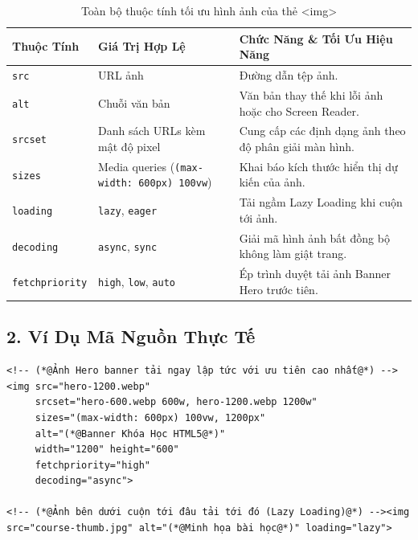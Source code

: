 \documentclass[11pt,oneside]{book}
\newcommand{\codeinline}[1]{\textcolor{accentOrange}{\texttt{#1}}}
\begin{document}
\begin{table}[H]
\centering
\begin{prettyTableBox}
\small
{}
\begin{tabularx}{\linewidth}{lp{3.5cm}X}
\rowcolor{primaryBlue}
\color{white}\textbf{Thuộc Tính} & \color{white}\textbf{Giá Trị Hợp Lệ} & \color{white}\textbf{Chức Năng \& Tối Ưu Hiệu Năng} \\
\hline
\codeinline{src} & URL ảnh & Đường dẫn tệp ảnh. \\
\codeinline{alt} & Chuỗi văn bản & Văn bản thay thế khi lỗi ảnh hoặc cho Screen Reader. \\
\codeinline{srcset} & Danh sách URLs kèm mật độ pixel & Cung cấp các định dạng ảnh theo độ phân giải màn hình. \\
\codeinline{sizes} & Media queries (\codeinline{(max-width: 600px) 100vw}) & Khai báo kích thước hiển thị dự kiến của ảnh. \\
\codeinline{loading} & \codeinline{lazy}, \codeinline{eager} & Tải ngầm Lazy Loading khi cuộn tới ảnh. \\
\codeinline{decoding} & \codeinline{async}, \codeinline{sync} & Giải mã hình ảnh bất đồng bộ không làm giật trang. \\
\codeinline{fetchpriority} & \codeinline{high}, \codeinline{low}, \codeinline{auto} & Ép trình duyệt tải ảnh Banner Hero trước tiên. \\
\end{tabularx}
\end{prettyTableBox}
\vspace{-2pt}
\caption{Toàn bộ thuộc tính tối ưu hình ảnh của thẻ <img>}
\end{table}

\subsection{2. Ví Dụ Mã Nguồn Thực Tế}
\begin{lstlisting}[language=HTML5, caption={Ví dụ ảnh chuẩn Responsive kèm Lazy Loading và Fetch Priority}]
<!-- (*@Ảnh Hero banner tải ngay lập tức với ưu tiên cao nhất@*) --><img src="hero-1200.webp"
     srcset="hero-600.webp 600w, hero-1200.webp 1200w"
     sizes="(max-width: 600px) 100vw, 1200px"
     alt="(*@Banner Khóa Học HTML5@*)"
     width="1200" height="600"
     fetchpriority="high"
     decoding="async">

<!-- (*@Ảnh bên dưới cuộn tới đâu tải tới đó (Lazy Loading)@*) --><img src="course-thumb.jpg" alt="(*@Minh họa bài học@*)" loading="lazy">
\end{lstlisting}
\end{document}
